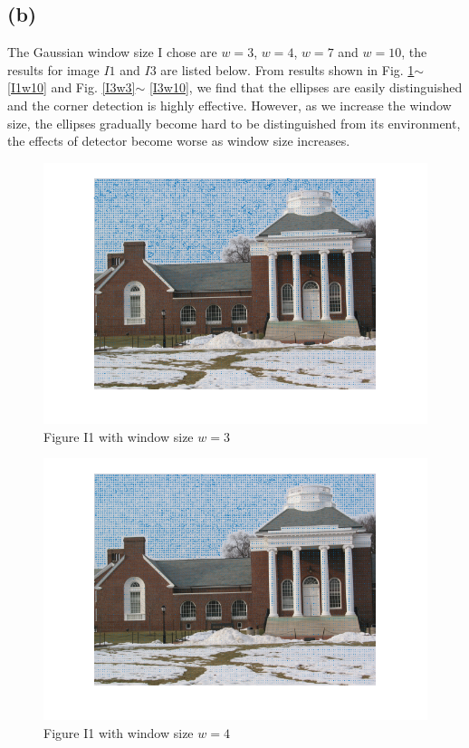 \documentclass[letterpaper]{article}
\begin{document}
\subsection*{(b)}
The Gaussian window size I chose are $w = 3$, $w = 4$, $w = 7$ and $w = 10$, the results for image $I1$ and $I3$ are listed below. From results shown in Fig. \ref{I1w3}$\sim$ \ref{I1w10} and Fig. \ref{I3w3}$\sim$ \ref{I3w10}, we find that the ellipses are easily distinguished and the corner detection is highly effective. However, as we increase the window size, the ellipses gradually become hard to be distinguished from its environment, the effects of detector become worse as window size increases.
\begin{figure}[H]
\centering
\includegraphics[scale=0.7]{I1w3.png}
\caption{Figure I1 with window size $w = 3$}
\label{I1w3}
\end{figure}
\begin{figure}[H]
\centering
\includegraphics[scale=0.7]{I1w4.png}
\caption{Figure I1 with window size $w = 4$}
\label{I1w4}
\end{figure}
\end{document}
